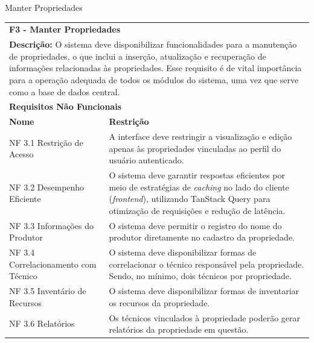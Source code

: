 \begin{tabframed}[htb]
  \caption{Manter Propriedades}
  \label{quad:requisitoManterPropriedades}
  \renewcommand{\arraystretch}{1.5}
  \begin{tabular}{|l|l|}
    \cline{1-2}
    \multicolumn{2}{|l|}{\textbf{F3 - Manter Propriedades}}
    \\ \cline{1-2}

    \multicolumn{2}{|p{15cm}|}{
    \raggedright \textbf{Descrição:} O sistema deve disponibilizar funcionalidades para a manutenção de propriedades, o que inclui a inserção, atualização e recuperação de informações relacionadas às propriedades. Esse requisito é de vital importância para a operação adequada de todos os módulos do sistema, uma vez que serve como a base de dados central.
    }
    \\ \cline{1-2}

    \multicolumn{2}{|l|}{\textbf{Requisitos Não Funcionais}}
    \\ \cline{1-2}

    \textbf{Nome}                         &
    \textbf{Restrição}
    \\ \cline{1-2}

    NF 3.1 Restrição de Acesso            &
    \multicolumn{1}{|p{9cm}|}{\raggedright A interface deve restringir a visualização e edição apenas às propriedades vinculadas ao perfil do usuário autenticado.}
    \\ \cline{1-2}

    NF 3.2 Desempenho Eficiente           &
    \multicolumn{1}{|p{9cm}|}{\raggedright O sistema deve garantir respostas eficientes por meio de estratégias de \textit{caching} no lado do cliente (\textit{frontend}), utilizando TanStack Query para otimização de requisições e redução de latência.}
    \\ \cline{1-2}

    NF 3.3 Informações do Produtor        &
    \multicolumn{1}{|p{9cm}|}{\raggedright O sistema deve permitir o registro do nome do produtor diretamente no cadastro da propriedade.}
    \\ \cline{1-2}

    NF 3.4 Correlacionamento com Técnico  &
    \multicolumn{1}{|p{9cm}|}{\raggedright O sistema deve disponibilizar formas de correlacionar o técnico responsável pela propriedade. Sendo, no mínimo, dois técnicos por propriedade.}
    \\ \cline{1-2}

    NF 3.5 Inventário de Recursos         &
    \multicolumn{1}{|p{9cm}|}{\raggedright O sistema deve disponibilizar formas de inventariar os recursos da propriedade.}
    \\ \cline{1-2}

    NF 3.6 Relatórios                     &
    \multicolumn{1}{|p{9cm}|}{\raggedright Os técnicos vinculados à propriedade poderão gerar relatórios da propriedade em questão.}
    \\ \cline{1-2}
  \end{tabular}
  \fonte{} %
\end{tabframed}

